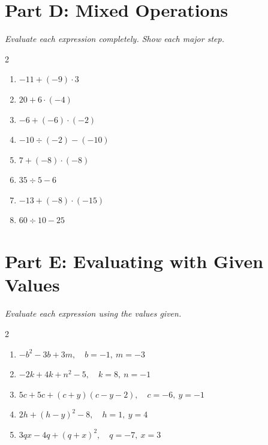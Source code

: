 \documentclass[11pt]{article}
\begin{document}
\section*{Part D: Mixed Operations}
\noindent\textit{Evaluate each expression completely. Show each major step.}
\begin{multicols}{2}
\begin{enumerate}
  \item $-11 + (-9) \cdot 3$
  \vspace{1.3cm}
  \item $20 + 6 \cdot (-4)$
  \vspace{1.3cm}
  \item $-6 + (-6) \cdot (-2)$
  \vspace{1.3cm}
  \item $-10 \div (-2) - (-10)$
  \vspace{1.3cm}
  \item $7 + (-8) \cdot (-8)$
  \vspace{1.3cm}
  \item $35 \div 5 - 6$
  \vspace{1.3cm}
  \item $-13 + (-8) \cdot (-15)$
  \vspace{1.3cm}
  \item $60 \div 10 - 25$
  \vspace{1.3cm}
\end{enumerate}
\end{multicols}

\section*{Part E: Evaluating with Given Values}
\noindent\textit{Evaluate each expression using the values given.}
\begin{multicols}{2}
\begin{enumerate}
  \item $- b^{2} - 3 b + 3 m, \quad b = -1,\ m = -3$
  \vspace{1.3cm}
  \item $- 2 k + 4 k + n^{2} - 5, \quad k = 8,\ n = -1$
  \vspace{1.3cm}
  \item $5 c + 5 c + \left(c + y\right) \left(c - y - 2\right), \quad c = -6,\ y = -1$
  \vspace{1.3cm}
  \item $2 h + \left(h - y\right)^{2} - 8, \quad h = 1,\ y = 4$
  \vspace{1.3cm}
  \item $3 q x - 4 q + \left(q + x\right)^{2}, \quad q = -7,\ x = 3$
  \vspace{1.3cm}
\end{enumerate}
\end{multicols}
\end{document}
